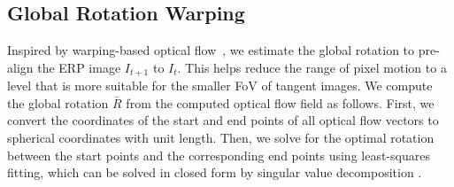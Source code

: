 


\subsection{Global Rotation Warping}
\label{sec:approach:warping}

Inspired by warping-based optical flow~\cite{BroxBPW2004}, we estimate the global rotation to pre-align the ERP image $I_{t+1}$ to $I_{t}$.
This helps reduce the range of pixel motion to a level that is more suitable for the smaller FoV of tangent images.
We compute the global rotation $\bar{R}$ from the computed optical flow field as follows.
First, we convert the coordinates of the start and end points of all optical flow vectors to spherical coordinates with unit length.
Then, we solve for the optimal rotation between the start points and the corresponding end points using least-squares fitting, which can be solved in closed form by singular value decomposition \cite{ArunHB1987,SorkiR2017}.

